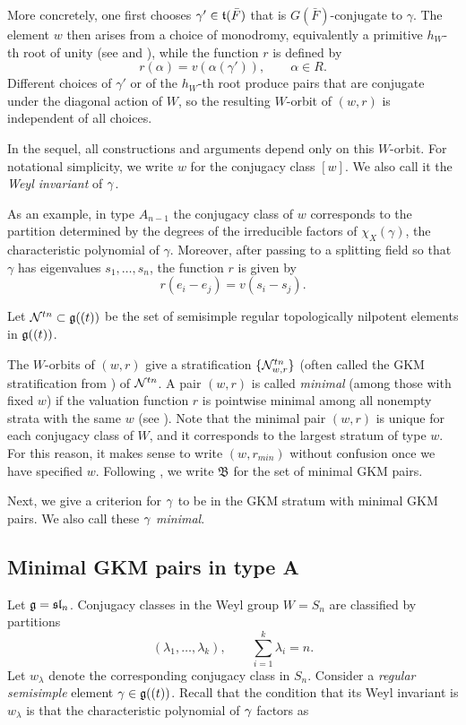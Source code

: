 \documentclass[11pt]{article}
\numberwithin{equation}{section}
\begin{document}
More concretely, one first chooses $\gamma'\in\mathfrak{t}(\bar F)$ that is
$G(\bar F)$-conjugate to $\gamma$. The element $w$ then arises from a choice of
monodromy, equivalently a primitive $h_W$-th root of unity (see
\cite{GKMstrat} and \cite[Section~0.5]{FKV}), while the function $r$ is defined by
\[
r(\alpha)=v(\alpha(\gamma')),\qquad \alpha\in R.
\]
Different choices of $\gamma'$ or of the $h_W$-th root produce pairs that are
conjugate under the diagonal action of $W$, so the resulting $W$-orbit of $(w,r)$
is independent of all choices.

In the sequel, all constructions and arguments depend only on this $W$-orbit. For notational simplicity, we write $w$ for the conjugacy class $[w]$. We also call it the \textit{Weyl invariant} of $\gamma$.

\begin{exa}
    As an example, in type $A_{n-1}$ the conjugacy class of $w$ corresponds to the
partition determined by the degrees of the irreducible factors of
$\chi_X(\gamma)$, the characteristic polynomial of $\gamma$. Moreover, after
passing to a splitting field so that $\gamma$ has eigenvalues
$s_1,\dots,s_n$, the function $r$ is given by
\[
r(e_i-e_j)=v(s_i-s_j).
\]
\end{exa}








Let $\mathcal{N}^{tn}\subset \mathfrak{g}((t))$ be the set of semisimple regular topologically nilpotent elements in $\mathfrak{g}((t))$.

The $W$-orbits of $(w,r)$ give a stratification $\{\mathcal{N}^{tn}_{w,r}\}$ (often called the GKM stratification from \cite{GKMstrat}) of $\mathcal{N}^{tn}$. A pair $(w,r)$ is called \emph{minimal} (among those with fixed $w$) if the valuation function $r$ is pointwise minimal among all nonempty strata with the same $w$ (see \cite[Section 0.6]{FKV}). Note that the minimal pair $(w,r)$ is unique for each conjugacy class of $W$, and it corresponds to the largest stratum of type $w$. For this reason, it makes sense to write $(w,r_{min})$ without confusion once we have specified $w$. Following \cite{FKV}, we write $\mathfrak{B}$ for the set of minimal GKM pairs.

Next, we give a criterion for $\gamma$ to be in the GKM stratum with minimal GKM pairs. We also call these $\gamma$ \textit{minimal}.

\subsection{Minimal GKM pairs in type A}\label{s:min Type A}
Let $\mathfrak{g}=\mathfrak{sl}_n$. Conjugacy classes in the Weyl group $W=S_n$ are classified by
partitions
\[
(\lambda_1,\dots,\lambda_k),\qquad \sum_{i=1}^k \lambda_i=n.
\]
Let $w_\lambda$ denote the corresponding conjugacy class in $S_n$.
Consider a \emph{regular semisimple} element $\gamma\in \mathfrak{g}((t))$. Recall that the condition that
its Weyl invariant is $w_\lambda$ is that the characteristic polynomial of $\gamma$ factors as 
\end{document}
